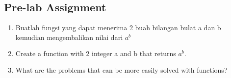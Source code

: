 \subsection{Pre-lab Assignment}
\begin{enumerate}
    \item Buatlah fungsi yang dapat menerima 2 buah bilangan 
    bulat a dan b kemudian mengembalikan nilai dari $a^b$
    \item Create a function with 2 integer a and 
    b that returns $a^b$.
    \item What are the problems that can be more easily solved with functions?
\end{enumerate}

